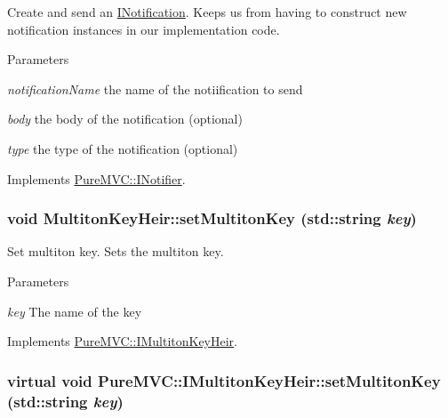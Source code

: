 Create and send an {\ttfamily \hyperlink{class_pure_m_v_c_1_1_i_notification}{INotification}}. Keeps us from having to construct new notification instances in our implementation code. 
\begin{DoxyParams}{Parameters}
\item[{\em notificationName}]the name of the notiification to send \item[{\em body}]the body of the notification (optional) \item[{\em type}]the type of the notification (optional) \end{DoxyParams}


Implements \hyperlink{class_pure_m_v_c_1_1_i_notifier_a65e8333ccfea74138b79f84dac96af25}{PureMVC::INotifier}.\hypertarget{class_pure_m_v_c_1_1_multiton_key_heir_abc70ef7c066bc8d7bf0196ec727599bb}{
\subsubsection[{setMultitonKey}]{\setlength{\rightskip}{0pt plus 5cm}void MultitonKeyHeir::setMultitonKey (std::string {\em key})}}
\label{class_pure_m_v_c_1_1_multiton_key_heir_abc70ef7c066bc8d7bf0196ec727599bb}


Set multiton key. Sets the multiton key. 
\begin{DoxyParams}{Parameters}
\item[{\em key}]The name of the key \end{DoxyParams}


Implements \hyperlink{class_pure_m_v_c_1_1_i_multiton_key_heir_a03acb75ab79defba2c28b8de1bbe1ca6}{PureMVC::IMultitonKeyHeir}.\hypertarget{class_pure_m_v_c_1_1_i_multiton_key_heir_a03acb75ab79defba2c28b8de1bbe1ca6}{
\subsubsection[{setMultitonKey}]{\setlength{\rightskip}{0pt plus 5cm}virtual void PureMVC::IMultitonKeyHeir::setMultitonKey (std::string {\em key})}}
\label{class_pure_m_v_c_1_1_i_multiton_key_heir_a03acb75ab79defba2c28b8de1bbe1ca6}


